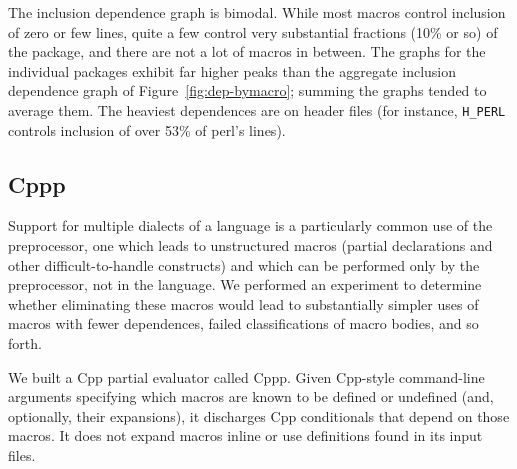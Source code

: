 \documentclass[10pt]{article}
\newcommand{\pkg}[1]{\textsf{#1}}
\begin{document}
% 
% 



The inclusion dependence graph is bimodal.  While most macros control
inclusion of zero or few lines, quite a few control very substantial
fractions (10\% or so) of the package, and there are not a lot of macros in
between.  The graphs for the individual packages exhibit far higher peaks
than the aggregate inclusion dependence graph of
Figure~\ref{fig:dep-bymacro}; summing the graphs tended to average them.
The heaviest dependences are on header files (for instance, \verb|H_PERL|
controls inclusion of over 53\% of \pkg{perl}'s lines).



\subsection{Cppp}

Support for multiple dialects of a language is a particularly common use of
the preprocessor, one which leads to unstructured macros (partial
declarations and other difficult-to-handle constructs) and which can be
performed only by the preprocessor, not in the language.  We performed an
experiment to determine whether eliminating these macros would lead to
substantially simpler uses of macros with fewer dependences, failed
classifications of macro bodies, and so forth.

We built a Cpp partial evaluator called Cppp.  Given Cpp-style command-line
arguments specifying which macros are known to be defined or undefined
(and, optionally, their expansions), it discharges Cpp conditionals that
depend on those macros.  It does not expand macros inline or use
definitions found in its input files.

\end{document}

